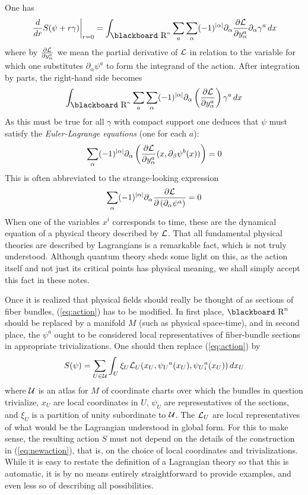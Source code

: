 \documentclass[12pt,titlepage]{article}
\def\bbf#1{\hbox{\blackboard #1}}
\def\lR{\bbf R}
\def\cL{{\cal L}}
\def\cU{{\cal U}}
\begin{document}
One has
\[
\left.\frac{d}{dr}S(\psi+r\gamma)\right|_{r=0} =
\int_{\lR^n} 
\sum_a\sum_\alpha(-1)^{|\alpha|}\partial_\alpha
\frac{\partial\cL}{\partial y^a_\alpha} \partial_\alpha
\gamma^a\,dx
\]
where by  \(\frac{\partial\cL}{\partial y^a_\alpha}\) 
 we mean the partial derivative of
\(\cL\) in relation to the variable for which one substitutes 
\(\partial_\alpha\psi^a\)
to form the integrand of the action.
After integration by parts, the right-hand side becomes
\[
\int_{\lR^n}\sum_a
\sum_\alpha(-1)^{|\alpha|}\partial_\alpha
\left(\frac{\partial\cL}{\partial y^a_\alpha}\right)
\gamma^a\,dx
\]
As this must be true for all \(\gamma\) with compact support one deduces
that \(\psi\) must satisfy the {\em Euler-Lagrange equations\/} 
(one for each \(a\)):
%
\[%
\sum_\alpha(-1)^{|\alpha|}\partial_\alpha\left(\frac{\partial\cL}
{\partial y^a_\alpha}
(x,\partial_\beta\psi^b(x))\right)
=0
\]%
This is often abbreviated to
the strange-looking expression
\[%
\sum_\alpha(-1)^{|\alpha|}\partial_\alpha
\frac{\partial\cL}{\partial\left(\partial_\alpha \psi^a\right)} =0
\]%
When one of the variables \(x^i\) corresponds to time, these are the
dynamical equation of a physical theory described by \(\cL\). That all
fundamental physical theories are described by Lagrangians is a
remarkable fact, which is not truly understood. Although quantum theory
sheds some light on this, as the action itself and not just its critical
points has physical meaning, we shall simply accept this fact in these
notes.




Once it is realized that physical fields should really be thought of
as sections of fiber bundles,
 (\ref{eq:action}) has to be modified. In
first place, \(\lR^n\) should be replaced by a manifold \(M\) (such as 
physical
space-time), and in
second place, the \(\psi^a\) ought to be considered local representatives
of fiber-bundle sections in appropriate trivializations. One should then
replace (\ref{eq:action}) by
\begin{equation}\label{eq:newaction}%
S(\psi) =\sum_{U\in\cU}\int_U\xi_U
\cL_U(x_U,\psi_U{}^a(x_U),\psi_U{}^a_i(x_U))\,dx_U
\end{equation}%
where \(\cU\) is an atlas for \(M\) of  coordinate charts over
which the bundles in question trivialize, \(x_U\) are local coordinates
in \(U\),  \(\psi_U\) are representatives of the sections, and \(\xi_U\)
is a partition of unity subordinate to \(\cU\). The \(\cL_U\) are local
representatives of what would be the Lagrangian understood in global
form. For this to make sense, the resulting action \(S\) must not depend
on the details of the construction in (\ref{eq:newaction}), that is, on
the choice of local coordinates and trivializations. While it is easy to
restate the definition of a Lagrangian theory so that this is automatic,
it is by no means entirely straightforward to provide examples, and even
less so of describing all possibilities.
\end{document}
